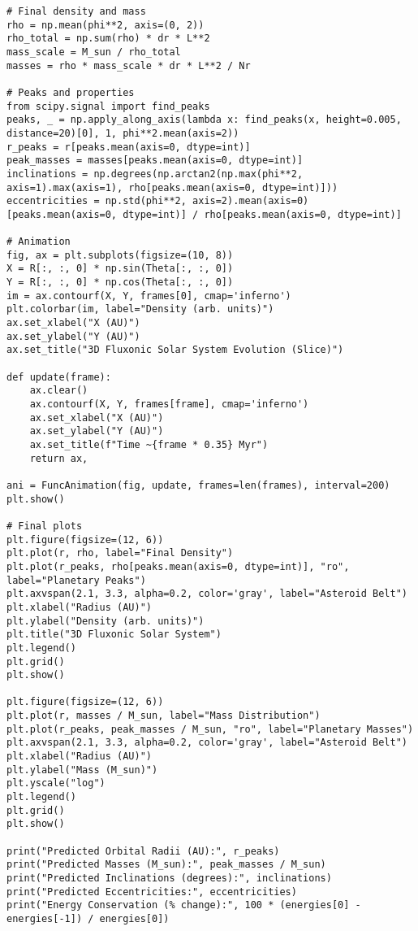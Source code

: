 \documentclass[11pt]{article}
\begin{document}
\begin{lstlisting}
# Final density and mass
rho = np.mean(phi**2, axis=(0, 2))
rho_total = np.sum(rho) * dr * L**2
mass_scale = M_sun / rho_total
masses = rho * mass_scale * dr * L**2 / Nr

# Peaks and properties
from scipy.signal import find_peaks
peaks, _ = np.apply_along_axis(lambda x: find_peaks(x, height=0.005, distance=20)[0], 1, phi**2.mean(axis=2))
r_peaks = r[peaks.mean(axis=0, dtype=int)]
peak_masses = masses[peaks.mean(axis=0, dtype=int)]
inclinations = np.degrees(np.arctan2(np.max(phi**2, axis=1).max(axis=1), rho[peaks.mean(axis=0, dtype=int)]))
eccentricities = np.std(phi**2, axis=2).mean(axis=0)[peaks.mean(axis=0, dtype=int)] / rho[peaks.mean(axis=0, dtype=int)]

# Animation
fig, ax = plt.subplots(figsize=(10, 8))
X = R[:, :, 0] * np.sin(Theta[:, :, 0])
Y = R[:, :, 0] * np.cos(Theta[:, :, 0])
im = ax.contourf(X, Y, frames[0], cmap='inferno')
plt.colorbar(im, label="Density (arb. units)")
ax.set_xlabel("X (AU)")
ax.set_ylabel("Y (AU)")
ax.set_title("3D Fluxonic Solar System Evolution (Slice)")

def update(frame):
    ax.clear()
    ax.contourf(X, Y, frames[frame], cmap='inferno')
    ax.set_xlabel("X (AU)")
    ax.set_ylabel("Y (AU)")
    ax.set_title(f"Time ~{frame * 0.35} Myr")
    return ax,

ani = FuncAnimation(fig, update, frames=len(frames), interval=200)
plt.show()

# Final plots
plt.figure(figsize=(12, 6))
plt.plot(r, rho, label="Final Density")
plt.plot(r_peaks, rho[peaks.mean(axis=0, dtype=int)], "ro", label="Planetary Peaks")
plt.axvspan(2.1, 3.3, alpha=0.2, color='gray', label="Asteroid Belt")
plt.xlabel("Radius (AU)")
plt.ylabel("Density (arb. units)")
plt.title("3D Fluxonic Solar System")
plt.legend()
plt.grid()
plt.show()

plt.figure(figsize=(12, 6))
plt.plot(r, masses / M_sun, label="Mass Distribution")
plt.plot(r_peaks, peak_masses / M_sun, "ro", label="Planetary Masses")
plt.axvspan(2.1, 3.3, alpha=0.2, color='gray', label="Asteroid Belt")
plt.xlabel("Radius (AU)")
plt.ylabel("Mass (M_sun)")
plt.yscale("log")
plt.legend()
plt.grid()
plt.show()

print("Predicted Orbital Radii (AU):", r_peaks)
print("Predicted Masses (M_sun):", peak_masses / M_sun)
print("Predicted Inclinations (degrees):", inclinations)
print("Predicted Eccentricities:", eccentricities)
print("Energy Conservation (% change):", 100 * (energies[0] - energies[-1]) / energies[0])
\end{lstlisting}
\end{document}
